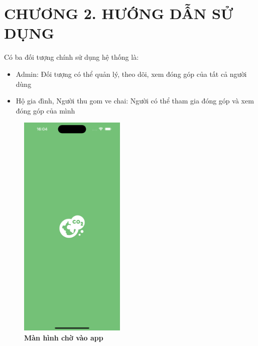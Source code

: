 
\section*{CHƯƠNG 2. HƯỚNG DẪN SỬ DỤNG}
\setcounter{section}{2}
\setcounter{subsection}{0} %
\setcounter{table}{0} %
\setcounter{figure}{0} %

Có ba đối tượng chính sử dụng hệ thống là:
\begin{adjustwidth}{1.5em}{}
  \begin{itemize}
    \item Admin: Đối tượng có thể quản lý, theo dõi, xem đóng góp của tất cả người dùng
    \item Hộ gia đình, Người thu gom ve chai: Người có thể tham gia đóng góp và xem đóng góp của mình
  \end{itemize}
\end{adjustwidth}
\begin{figure}[H]
  \centering
  \includegraphics[width=0.45\textwidth]{Images/mobile/splash_screen.png}
  \caption[Màn hình chờ vào app]{\bfseries \fontsize{12pt}{0pt}
  \selectfont Màn hình chờ vào app}
  \label{splash_screen_waznet} %
\end{figure}
